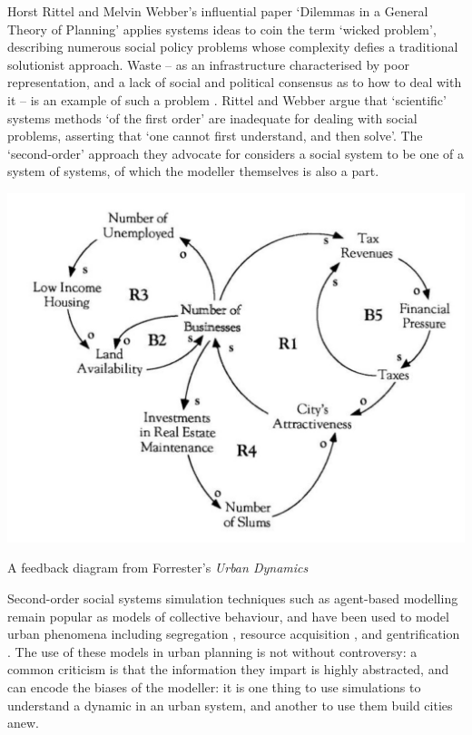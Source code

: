 \documentclass[nofonts,nols,justified,nobib]{tufte-book}
\begin{document}
Horst Rittel and Melvin Webber's influential paper `Dilemmas in a General Theory of Planning' \cite{rittel_dilemmas_1973} applies systems ideas to coin the term `wicked problem', describing numerous social policy problems whose complexity defies a traditional solutionist approach. Waste -- as an infrastructure characterised by poor representation, and a lack of social and political consensus as to how to deal with it -- is an example of such a problem \cite{liboiron_trash_2012}. Rittel and Webber argue that `scientific' systems methods `of the first order' are inadequate for dealing with social problems, asserting that `one cannot first understand, and then solve'. The `second-order' approach they advocate for considers a social system to be one of a system of systems, of which the modeller themselves is also a part. 
\begin{marginfigure}
\includegraphics[width=\textwidth]{img/1/urban-dynamics.jpg}
\caption{A feedback diagram from Forrester's \emph{Urban Dynamics} \cite{forrester_urban_1969} }
\end{marginfigure}
Second-order social systems simulation techniques such as agent-based modelling remain popular as models of collective behaviour, and have been used to model urban phenomena including segregation \cite{schelling_dynamic_1971}, resource acquisition \cite{epstein_growing_1996-1}, and gentrification \cite{batty_new_2013}. The use of these models in urban planning is not without controversy: a common criticism is that the information they impart is highly abstracted, and can encode the biases of the modeller: it is one thing to use simulations to understand a dynamic in an urban system, and another to use them build cities anew.
\end{document}
